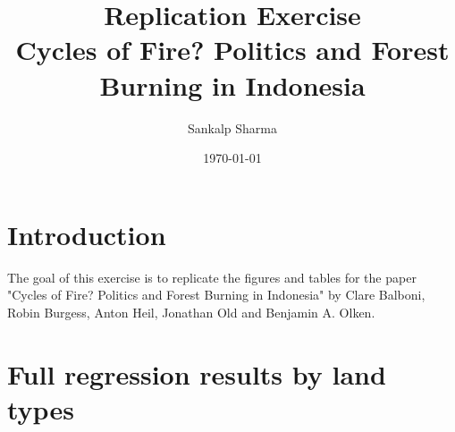 \documentclass[11pt,a4paper]{article}
\begin{document}
\title{Replication Exercise  \\ 
Cycles of Fire? Politics and Forest Burning in Indonesia}

\author{Sankalp Sharma}
\date{\today}

\maketitle

\section{Introduction}

The goal of this exercise is to replicate the figures and tables for the paper "Cycles of Fire? Politics and Forest Burning in Indonesia" by Clare Balboni, Robin Burgess, Anton Heil, Jonathan Old and Benjamin A. Olken.

\appendix
\setcounter{section}{1}
\section{Full regression results by land types\label{sec:regtables}}
\setcounter{table}{0}
\renewcommand{\thetable}{B\arabic{table}}
\setcounter{figure}{0}
\renewcommand{\thefigure}{B\arabic{figure}}

\begin{table}[H]
	\centering
	\caption{Electoral cycle by land types -- Ignitions, District and Year FE}
  \end{table}

\begin{table}[H]
	\centering
	\caption{Electoral cycle by land types -- Total area burned, District and Year FE}
\end{table}
\end{document}
